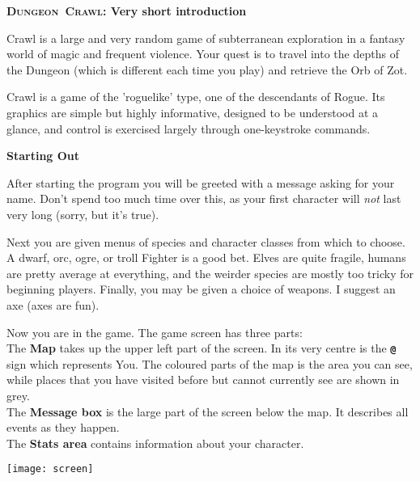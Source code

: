 \documentclass[a4paper,10pt]{article}
\newcommand{\key}[1]{{{\texttt{\textbf{#1}}}}} %
\newcommand{\sex}[1]{{{\textbf{#1}}}} %
\newcommand{\crawl}{\textsc{Crawl}}
\newcommand{\dungeon}{\textsc{Dungeon}}
\newcommand{\para}{\vspace{1.5ex}}
\begin{document}
\begin{center}\textbf{\LARGE
\dungeon\ \crawl: Very short introduction}
\end{center}

Crawl is a large and very random game of subterranean exploration in a fantasy 
world of magic and frequent violence. Your quest is to travel into the depths 
of the Dungeon (which is different each time you play) and retrieve the Orb of 
Zot. 

\para

Crawl is a game of the 'roguelike' type, one of the descendants of Rogue. Its 
graphics are simple but highly informative, designed to be understood at a 
glance, and control is exercised largely through one-keystroke commands. 

\para\para

\sex{Starting Out} \para

After starting the program you will be greeted with a message asking for your 
name. Don't spend too much time over this, as your first character will 
\emph{not} last very long (sorry, but it's true). 

\para

Next you are given menus of species and character classes from which to 
choose. A dwarf, orc, ogre, or troll Fighter is a good bet. Elves are quite 
fragile, humans are pretty average at everything, and the weirder species are 
mostly too tricky for beginning players. Finally, you may be given a choice of 
weapons. I suggest an axe (axes are fun). 

\para

\begin{minipage}{10cm}
Now you are in the game. The game screen has three parts: \\
The \textbf{Map} takes up the upper left part of the screen. In its very 
centre is the \key{@} sign which represents You. The coloured parts of the map
is the area you can see, while places that you have visited before but cannot
currently see are shown in grey. \\
The \textbf{Message box} is the large part of the screen below the map. It 
describes all events as they happen. \\
The \textbf{Stats area} contains information about your character. 
\end{minipage}
\begin{minipage}{1cm}
\phantom{xx}
\end{minipage}
\begin{minipage}{4cm}
\texttt{[image: screen]}
\end{minipage}
\para\para
\end{document}
